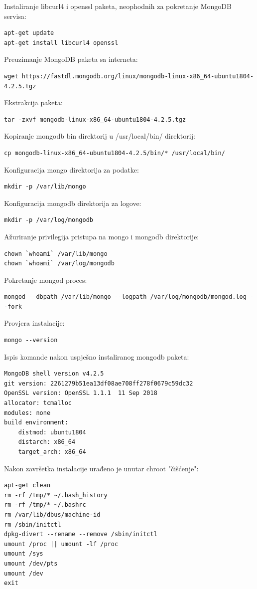 \documentclass[12pt,vi]{mitthesis}
\begin{document}
\noindent
Instaliranje libcurl4 i openssl paketa, neophodnih za pokretanje MongoDB servisa:
\begin{lstlisting}[style=BashInputStyle]
apt-get update
apt-get install libcurl4 openssl
\end{lstlisting}
\noindent
Preuzimanje MongoDB paketa sa interneta:
\begin{lstlisting}[style=BashInputStyle]
wget https://fastdl.mongodb.org/linux/mongodb-linux-x86_64-ubuntu1804-4.2.5.tgz
\end{lstlisting}
\noindent
Ekstrakcija paketa:
\begin{lstlisting}[style=BashInputStyle]
tar -zxvf mongodb-linux-x86_64-ubuntu1804-4.2.5.tgz
\end{lstlisting}
\noindent
Kopiranje mongodb bin direktorij u /usr/local/bin/ direktorij:
\begin{lstlisting}[style=BashInputStyle]
cp mongodb-linux-x86_64-ubuntu1804-4.2.5/bin/* /usr/local/bin/
\end{lstlisting}
\noindent
Konfiguracija mongo direktorija za podatke:
\begin{lstlisting}[style=BashInputStyle]
mkdir -p /var/lib/mongo
\end{lstlisting}
\noindent
Konfiguracija mongodb direktorija za logove:
\begin{lstlisting}[style=BashInputStyle]
mkdir -p /var/log/mongodb
\end{lstlisting}
\noindent
Ažuriranje privilegija pristupa na mongo i mongodb direktorije:
\begin{lstlisting}[style=BashInputStyle]
chown `whoami` /var/lib/mongo 
chown `whoami` /var/log/mongodb
\end{lstlisting}
\noindent
Pokretanje mongod proces:
\begin{lstlisting}[style=BashInputStyle]
mongod --dbpath /var/lib/mongo --logpath /var/log/mongodb/mongod.log --fork
\end{lstlisting}
\noindent
Provjera instalacije:
\begin{lstlisting}[style=BashInputStyle]
mongo --version
\end{lstlisting}
\noindent
Ispis komande nakon uspješno instaliranog mongodb paketa:
\begin{lstlisting}[style=BashInputStyle]
MongoDB shell version v4.2.5
git version: 2261279b51ea13df08ae708ff278f0679c59dc32
OpenSSL version: OpenSSL 1.1.1  11 Sep 2018
allocator: tcmalloc
modules: none
build environment:
    distmod: ubuntu1804
    distarch: x86_64
    target_arch: x86_64
\end{lstlisting}
\noindent
Nakon završetka instalacije urađeno je unutar chroot "čišćenje":
\begin{lstlisting}[style=BashInputStyle]
apt-get clean
rm -rf /tmp/* ~/.bash_history
rm -rf /tmp/* ~/.bashrc
rm /var/lib/dbus/machine-id
rm /sbin/initctl
dpkg-divert --rename --remove /sbin/initctl
umount /proc || umount -lf /proc
umount /sys
umount /dev/pts
umount /dev
exit
\end{lstlisting}
\end{document}
